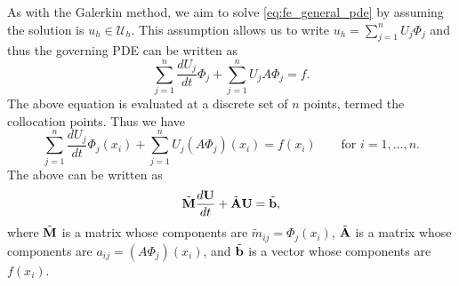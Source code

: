 \documentclass[oneside,a4paper,11pt]{report}
\begin{document}
As with the Galerkin method, we aim to solve \cref{eq:fe_general_pde} by assuming the solution is $u_h \in \mathcal{U}_h$. This assumption allows us to write $u_h= \sum_{j=1}^n U_j \Phi_j$ and thus the governing PDE can be written as
\begin{equation}
    \sum_{j=1}^n \frac{dU_j}{dt} \Phi_j + \sum_{j=1}^n U_j A\Phi_j = f.
\end{equation}
The above equation is evaluated at a discrete set of $n$ points, termed the collocation points. Thus we have
\begin{equation}
    \sum_{j=1}^n \frac{dU_j}{dt} \Phi_j(x_i) + \sum_{j=1}^n U_j (A\Phi_j)(x_i) = f(x_i) \qquad \text{for }i=1,...,n.
\end{equation}
The above can be written as
\begin{equation}
    \tilde{\mathbf{M}} \frac{d \mathbf{U}}{dt} + \tilde{\mathbf{A}} \mathbf{U} = \tilde{\mathbf{b}},
\end{equation}
where $\tilde{\mathbf{M}}$ is a matrix whose components are $\tilde{m}_{ij} = \Phi_j(x_i)$, $\tilde{\mathbf{A}}$ is a matrix whose components are $a_{ij} = (A\Phi_j)(x_i)$, and $\tilde{\mathbf{b}}$ is a vector whose components are $f(x_i)$.
\end{document}
